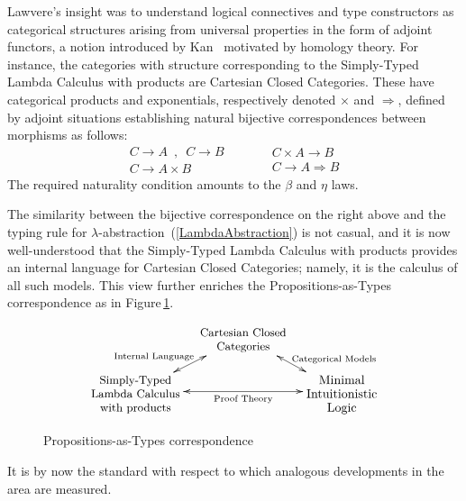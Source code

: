 \documentclass[11pt,twocolumn]{article}
\begin{document}
Lawvere's insight was to understand logical connectives and type
constructors as categorical structures arising from universal properties
in the form of adjoint functors, a notion introduced by Kan~\cite{Kan}
motivated by homology theory.  For instance, the categories with structure
corresponding to the Simply-Typed Lambda Calculus with products are
Cartesian Closed Categories.  These have categorical products and
exponentials, respectively denoted $\times$ and $\Rightarrow$, defined by
adjoint situations establishing natural bijective correspondences between
morphisms as follows:
\[
  \begin{array}{c}
    C\to A \enspace,\enspace C\to B
    \\ \hline\hline
    C\to A\times B
  \end{array}
  \quad\qquad
  \begin{array}{c}
    C\times A\to B
    \\ \hline\hline
    C\to A\Rightarrow B
  \end{array}
\]
The required naturality condition amounts to the $\beta$ and $\eta$ laws.

The similarity between the bijective correspondence on the right above and
the typing rule for \mbox{$\lambda$-abstraction}~(\ref{LambdaAbstraction})
is not casual, and it is now well-understood that the Simply-Typed Lambda
Calculus with products provides an internal language for Cartesian Closed
Categories; namely, it is the calculus of all such models.  This view further
enriches the Propositions-as-Types correspondence as in Figure\,\ref{PAT}.
\begin{figure}[h]
\caption{Propositions-as-Types correspondence}
\vspace*{2mm}
\[\xymatrix@C=10pt@R=12.5pt{
    & \ar@{<->}[dl]_(.5){\null\hspace*{-15mm}\txt{\scriptsize Internal
        Language}} \ar@{<->}[dr]^(.55){\null\hspace*{4mm}\txt{\scriptsize Categorical
        Models}}
    \txt{\small Cartesian Closed\\ \small Categories} & \\
    \txt{\small Simply-Typed\\ \small Lambda Calculus\\ \small with products}
    \ar@{<->}[rr]_-{\txt{\scriptsize Proof Theory}} & & 
    \txt{Minimal\\ Intuitionistic\\ Logic}
  }\]
\vspace*{-2mm}
\label{PAT}
\end{figure}
It is by now the standard with respect to which analogous developments in the
area are measured.  
\end{document}
